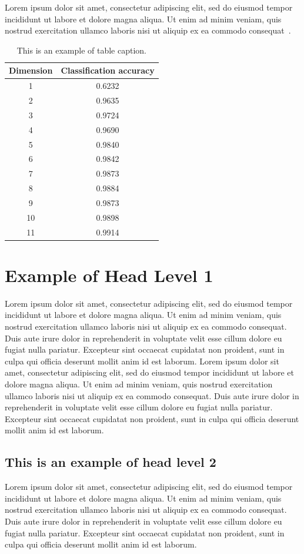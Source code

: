 \documentclass{sbc2023}%
\begin{document}
Lorem ipsum dolor sit amet, consectetur adipiscing elit, sed do eiusmod tempor incididunt ut labore et dolore magna aliqua. Ut enim ad minim veniam, quis nostrud exercitation ullamco laboris nisi ut aliquip ex ea commodo consequat~\citep{ref4}.

\begin{table}[!ht]
\caption{This is an example of table caption.}
\centering
\begin{tabular}{@{}cc@{}}
\hline\hline
Dimension & Classification accuracy \\
\hline%
 1  & 0.6232 \\
 2  & 0.9635 \\ 
 3  & 0.9724 \\ 
 4  & 0.9690 \\ 
 5  & 0.9840 \\ 
 6  & 0.9842 \\ 
 7  & 0.9873 \\ 
 8  & 0.9884 \\
 9  & 0.9873 \\ 
 10 & 0.9898 \\ 
 11 & 0.9914 \\
\hline\hline
\end{tabular}
\label{tab1}
\end{table}

 
\section{Example of Head Level 1}
Lorem ipsum dolor sit amet, consectetur adipiscing elit, sed do eiusmod tempor incididunt ut labore et dolore magna aliqua. Ut enim ad minim veniam, quis nostrud exercitation ullamco laboris nisi ut aliquip ex ea commodo consequat. Duis aute irure dolor in reprehenderit in voluptate velit esse cillum dolore eu fugiat nulla pariatur. Excepteur sint occaecat cupidatat non proident, sunt in culpa qui officia deserunt mollit anim id est laborum. Lorem ipsum dolor sit amet, consectetur adipiscing elit, sed do eiusmod tempor incididunt ut labore et dolore magna aliqua. Ut enim ad minim veniam, quis nostrud exercitation ullamco laboris nisi ut aliquip ex ea commodo consequat. Duis aute irure dolor in reprehenderit in voluptate velit esse cillum dolore eu fugiat nulla pariatur. Excepteur sint occaecat cupidatat non proident, sunt in culpa qui officia deserunt mollit anim id est laborum.

\subsection{This is an example of head level 2}
Lorem ipsum dolor sit amet, consectetur adipiscing elit, sed do eiusmod tempor incididunt ut labore et dolore magna aliqua. Ut enim ad minim veniam, quis nostrud exercitation ullamco laboris nisi ut aliquip ex ea commodo consequat. Duis aute irure dolor in reprehenderit in voluptate velit esse cillum dolore eu fugiat nulla pariatur. Excepteur sint occaecat cupidatat non proident, sunt in culpa qui officia deserunt mollit anim id est laborum.
\end{document}
